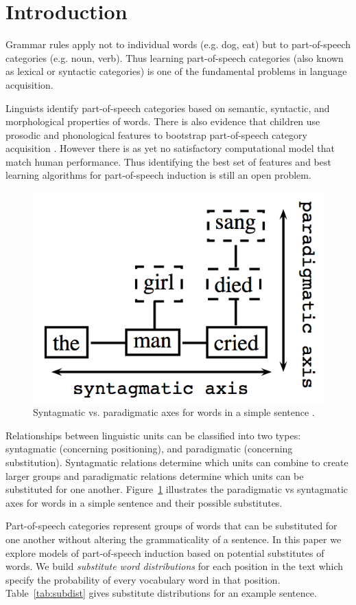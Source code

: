 \section{Introduction}
\label{sec:intro}

Grammar rules apply not to individual words (e.g. dog, eat) but to
part-of-speech categories (e.g. noun, verb).  Thus learning
part-of-speech categories (also known as lexical or syntactic
categories) is one of the fundamental problems in language
acquisition.

Linguists identify part-of-speech categories based on semantic,
syntactic, and morphological properties of words.  There is also
evidence that children use prosodic and phonological features to
bootstrap part-of-speech category acquisition
\cite{ambridge2011child}.  However there is as yet no satisfactory
computational model that match human performance.  Thus identifying
the best set of features and best learning algorithms for
part-of-speech induction is still an open problem.

\begin{figure}[t] 
  \centering
  \includegraphics[height=0.3\textwidth]{paradigmatic.png}
  \caption{Syntagmatic vs. paradigmatic axes for words in a simple
    sentence \protect\cite{chandler2007semiotics}.}
  \label{fig:paradigmatic}
\end{figure}

Relationships between linguistic units can be classified into two
types: syntagmatic (concerning positioning), and paradigmatic
(concerning substitution).  Syntagmatic relations determine which
units can combine to create larger groups and paradigmatic relations
determine which units can be substituted for one another.
Figure~\ref{fig:paradigmatic} illustrates the paradigmatic vs
syntagmatic axes for words in a simple sentence and their possible
substitutes.  

Part-of-speech categories represent groups of words that can be
substituted for one another without altering the grammaticality of a
sentence.  In this paper we explore models of part-of-speech induction
based on potential substitutes of words.  We build {\em substitute
  word distributions} for each position in the text which specify the
probability of every vocabulary word in that position.
Table~\ref{tab:subdist} gives substitute distributions for an example
sentence.

